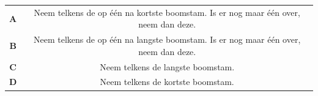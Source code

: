 \documentclass[12pt, a4paper]{article}
\begin{document}
\begin{minipage}{\textwidth}
			\begin{table}[H]
				\centering
				\begin{tabular}{|c|c|}
					\hline
					\textbf{A} & Neem telkens de op één na kortste boomstam. Is er nog maar één over, neem dan deze. \\
					\textbf{B} & Neem telkens de op één na langste boomstam. Is er nog maar één over, neem dan deze. \\ 
					\textbf{C} & Neem telkens de langste boomstam. \\ 
					\textbf{D} & Neem telkens de kortste boomstam. \\
					\hline 
				\end{tabular}
			\end{table}
	\end{minipage} \\ \\
	
\end{document}
